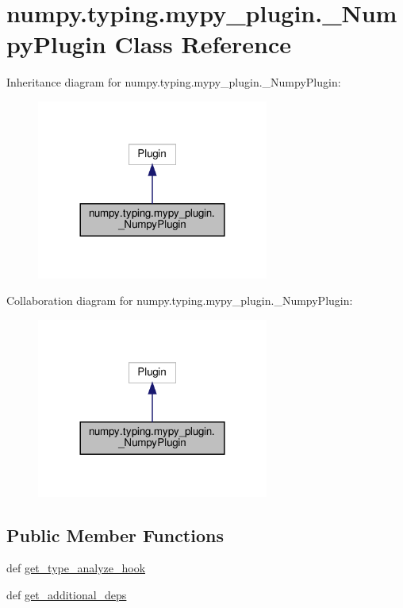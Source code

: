 \hypertarget{classnumpy_1_1typing_1_1mypy__plugin_1_1__NumpyPlugin}{}\section{numpy.\+typing.\+mypy\+\_\+plugin.\+\_\+\+Numpy\+Plugin Class Reference}
\label{classnumpy_1_1typing_1_1mypy__plugin_1_1__NumpyPlugin}


Inheritance diagram for numpy.\+typing.\+mypy\+\_\+plugin.\+\_\+\+Numpy\+Plugin\+:
\nopagebreak
\begin{figure}[H]
\begin{center}
\leavevmode
\includegraphics[width=216pt]{classnumpy_1_1typing_1_1mypy__plugin_1_1__NumpyPlugin__inherit__graph}
\end{center}
\end{figure}


Collaboration diagram for numpy.\+typing.\+mypy\+\_\+plugin.\+\_\+\+Numpy\+Plugin\+:
\nopagebreak
\begin{figure}[H]
\begin{center}
\leavevmode
\includegraphics[width=216pt]{classnumpy_1_1typing_1_1mypy__plugin_1_1__NumpyPlugin__coll__graph}
\end{center}
\end{figure}
\subsection*{Public Member Functions}
\begin{DoxyCompactItemize}
\item 
def \hyperlink{classnumpy_1_1typing_1_1mypy__plugin_1_1__NumpyPlugin_a9fe03522416589184c8e6c5df4494964}{get\+\_\+type\+\_\+analyze\+\_\+hook}
\item 
def \hyperlink{classnumpy_1_1typing_1_1mypy__plugin_1_1__NumpyPlugin_a13dacd26fb15f95d074eb617a1642631}{get\+\_\+additional\+\_\+deps}
\end{DoxyCompactItemize}


